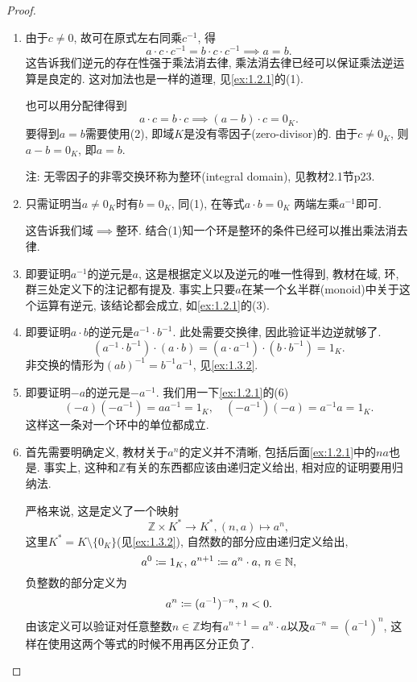 \begin{proof}
    \begin{enumerate}[(1)]
        \item 由于$c \neq 0$, 故可在原式左右同乘$c^{-1}$, 得 
        \[
            a \cdot c \cdot c^{-1} = b \cdot c \cdot c^{-1} \implies a = b.
        \]
        这告诉我们逆元的存在性强于乘法消去律, 乘法消去律已经可以保证乘法逆运算是良定的. 这对加法也是一样的道理, 见\ref{ex:1.2.1}的(1).

        也可以用分配律得到
        \[
            a \cdot c = b \cdot c \implies (a - b) \cdot c = 0_K.
        \]
        要得到$a = b$需要使用(2), 即域$K$是没有零因子(zero-divisor)的. 由于$c \neq 0_K$, 则$a - b = 0_K$, 即$a = b$.

        注: 无零因子的非零交换环称为整环(integral domain), 见教材2.1节p23.
        \item 只需证明当$a \neq 0_K$时有$b = 0_K$, 同(1), 在等式$a \cdot b = 0_K$    两端左乘$a^{-1}$即可.
        
        这告诉我们域$\implies$整环. 结合(1)知一个环是整环的条件已经可以推出乘法消去律.
        \item 即要证明$a^{-1}$的逆元是$a$, 这是根据定义以及逆元的唯一性得到, 教材在域, 环, 群三处定义下的注记都有提及. 事实上只要$a$在某一个幺半群(monoid)中关于这个运算有逆元, 该结论都会成立, 如\ref{ex:1.2.1}的(3).
        \item 即要证明$a \cdot b$的逆元是$a^{-1} \cdot b^{-1}$. 此处需要交换律, 因此验证半边逆就够了.
        \[
            (a^{-1} \cdot b^{-1}) \cdot (a \cdot b) = (a \cdot a^{-1}) \cdot (b \cdot b^{-1}) = 1_K.
        \]
        非交换的情形为$(ab)^{-1} = b^{-1}a^{-1}$, 见\ref{ex:1.3.2}.
        \item 即要证明$-a$的逆元是$-a^{-1}$. 我们用一下\ref{ex:1.2.1}的(6)
        \[
            (-a)(-a^{-1}) = aa^{-1} = 1_K, \quad (-a^{-1})(-a) = a^{-1}a = 1_K.
        \]
        这样这一条对一个环中的单位都成立.
        \item 首先需要明确定义, 教材关于$a^n$的定义并不清晰, 包括后面\ref{ex:1.2.1}中的$na$也是. 事实上, 这种和$\mathbb{Z}$有关的东西都应该由递归定义给出, 相对应的证明要用归纳法.
        
        严格来说, 这是定义了一个映射
        \[
            \mathbb{Z} \times K^* \to K^*, (n, a) \mapsto a^n,
        \]
        这里$K^* = K \setminus \{0_K\}$(见\ref{ex:1.3.2}), 自然数的部分应由递归定义给出,
        \[
            a^0 \mathrel{\coloneqq} 1_K,\, a^{n + 1} \mathrel{\coloneqq} a^n \cdot a,\, n \in \mathbb{N},
        \]
        负整数的部分定义为
        \[
            a^n \mathrel{\coloneqq} (a^{-1})^{-n},\, n < 0.
        \]
        由该定义可以验证对任意整数$n \in \mathbb{Z}$均有$a^{n + 1} = a^n \cdot a$以及$a^{-n} = (a^{-1})^n$, 这样在使用这两个等式的时候不用再区分正负了.
        

\end{enumerate}
\end{proof}
